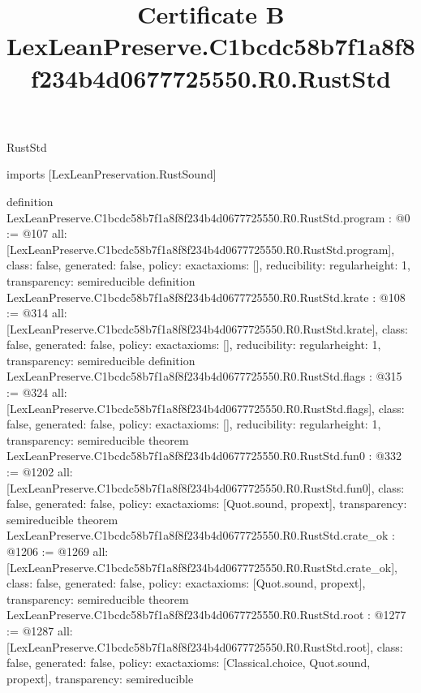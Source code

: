 \begin{lexlean}{RustStd}
\title{Certificate B LexLeanPreserve.C1bcdc58b7f1a8f8f234b4d0677725550.R0.RustStd}
\begin{coremodule}
imports [LexLeanPreservation.RustSound]

definition LexLeanPreserve.C1bcdc58b7f1a8f8f234b4d0677725550.R0.RustStd.program : @0 := @107 {
  all: [LexLeanPreserve.C1bcdc58b7f1a8f8f234b4d0677725550.R0.RustStd.program],
  class: false,
  generated: false,
  policy: exact{axioms: []},
  reducibility: regular{height: 1},
  transparency: semireducible
}
definition LexLeanPreserve.C1bcdc58b7f1a8f8f234b4d0677725550.R0.RustStd.krate : @108 := @314 {
  all: [LexLeanPreserve.C1bcdc58b7f1a8f8f234b4d0677725550.R0.RustStd.krate],
  class: false,
  generated: false,
  policy: exact{axioms: []},
  reducibility: regular{height: 1},
  transparency: semireducible
}
definition LexLeanPreserve.C1bcdc58b7f1a8f8f234b4d0677725550.R0.RustStd.flags : @315 := @324 {
  all: [LexLeanPreserve.C1bcdc58b7f1a8f8f234b4d0677725550.R0.RustStd.flags],
  class: false,
  generated: false,
  policy: exact{axioms: []},
  reducibility: regular{height: 1},
  transparency: semireducible
}
theorem LexLeanPreserve.C1bcdc58b7f1a8f8f234b4d0677725550.R0.RustStd.fun0 : @332 := @1202 {
  all: [LexLeanPreserve.C1bcdc58b7f1a8f8f234b4d0677725550.R0.RustStd.fun0],
  class: false,
  generated: false,
  policy: exact{axioms: [Quot.sound, propext]},
  transparency: semireducible
}
theorem LexLeanPreserve.C1bcdc58b7f1a8f8f234b4d0677725550.R0.RustStd.crate_ok : @1206 := @1269 {
  all: [LexLeanPreserve.C1bcdc58b7f1a8f8f234b4d0677725550.R0.RustStd.crate_ok],
  class: false,
  generated: false,
  policy: exact{axioms: [Quot.sound, propext]},
  transparency: semireducible
}
theorem LexLeanPreserve.C1bcdc58b7f1a8f8f234b4d0677725550.R0.RustStd.root : @1277 := @1287 {
  all: [LexLeanPreserve.C1bcdc58b7f1a8f8f234b4d0677725550.R0.RustStd.root],
  class: false,
  generated: false,
  policy: exact{axioms: [Classical.choice, Quot.sound, propext]},
  transparency: semireducible
}


\end{coremodule}
\end{lexlean}
